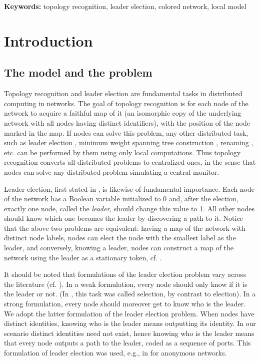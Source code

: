 \documentclass[a4paper,10pt]{article}
\begin{document}
\textbf{Keywords:} topology recognition, leader election, colored network, local model

\section{Introduction} \label{sec:intro}

\subsection{The model and the problem} \label{subsec:model}

Topology recognition and leader election are fundamental tasks in distributed computing in  networks. The goal of topology recognition is for each node of the network to acquire a faithful map of it (an isomorphic
copy of the underlying network with all nodes having distinct identifiers), with the position of the node marked in the map. If nodes can solve this problem, any other 
distributed task, such as leader election \cite{HS,P}, minimum weight spanning tree construction \cite{A}, 
renaming \cite{ABDKPR}, etc. can be performed by them using
only local computations. Thus topology recognition converts all distributed problems to centralized ones, 
in the sense that nodes can solve any distributed problem simulating a central monitor.

Leader election, first stated in \cite{LL}, is likewise of fundamental importance.
Each node of the network has a Boolean variable initialized to 0 and, after the election, exactly one node,
called the {\em leader}, should change this value to 1. All other nodes should know which one becomes the leader by discovering a path to it.
Notice that the above two problems are equivalent: having a map of the network with distinct node labels, nodes can elect the node with the smallest
label as the leader, and conversely, knowing a leader, nodes can construct a map of the network using the leader as a stationary token, cf. \cite{CDK}.

It should be noted that formulations of the leader election problem vary across the literature (cf. \cite{Ly}). In a weak formulation, every node should only know if it is the leader or not. (In \cite{MP}, this task was called selection, by contrast to election). In a strong formulation, every node should moreover get to know who is the leader. We adopt the latter formulation of the leader election problem. When nodes have distinct identities, knowing who is the leader means outputting its identity. In our scenario distinct identities need not exist, hence knowing who is the leader means that every node outputs a path to the leader, coded as a sequence of ports. This formulation of leader election was used, e.g., in \cite{GMP} for anonymous networks.   
\end{document}
